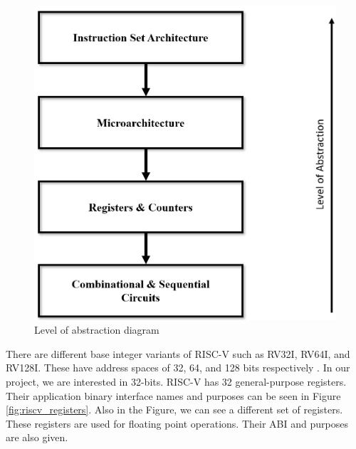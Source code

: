 \begin{figure}[h!]
    \centering
    \includegraphics[scale=0.25]{riscv/level_of_abstraction_diagram.jpeg}
    \caption{Level of abstraction diagram \cite{levelofabstrac}}
    \label{fig:level_of_abstraction_diagram}
\end{figure}

There are different base integer variants of RISC-V such as RV32I, RV64I, and RV128I. These have address spaces of 32, 64, and 128 bits respectively \cite{Altinayozlem}. In our project, we are interested in 32-bits. RISC-V has 32 general-purpose registers. Their application binary interface names and purposes can be seen in Figure \ref{fig:riscv_registers}. Also in the Figure, we can see a different set of registers. These registers are used for floating point operations. Their ABI and purposes are also given.

